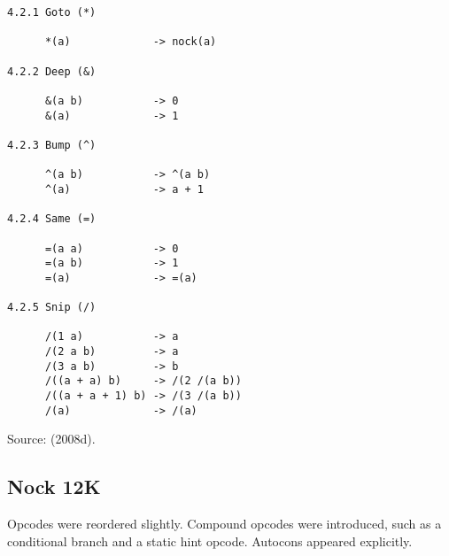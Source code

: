 \documentclass[twoside]{article}
\begin{document}
\begin{lstlisting}[label=lst:nock13k,caption={Nock 13K, 8 March 2008.},style=listingcode]
4.2.1 Goto (*)

      *(a)             -> nock(a)

4.2.2 Deep (&)

      &(a b)           -> 0
      &(a)             -> 1

4.2.3 Bump (^)

      ^(a b)           -> ^(a b)
      ^(a)             -> a + 1

4.2.4 Same (=)

      =(a a)           -> 0
      =(a b)           -> 1
      =(a)             -> =(a)

4.2.5 Snip (/)

      /(1 a)           -> a
      /(2 a b)         -> a
      /(3 a b)         -> b
      /((a + a) b)     -> /(2 /(a b))
      /((a + a + 1) b) -> /(3 /(a b))
      /(a)             -> /(a)
\end{lstlisting}

Source:   (2008d). %

\subsection{Nock 12K}

Opcodes were reordered slightly.  Compound opcodes were introduced, such as a conditional branch and a static hint opcode.  Autocons appeared explicitly.
\end{document}
